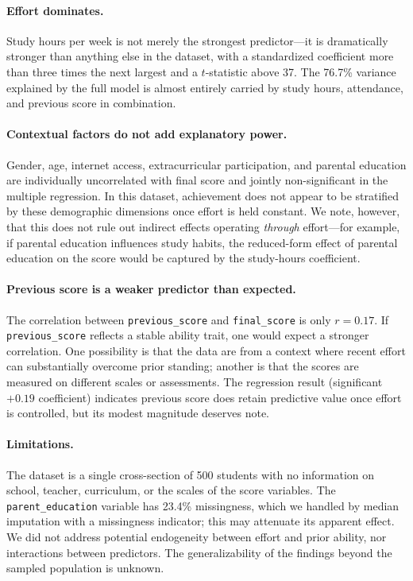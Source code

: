 \documentclass[11pt]{article}
\begin{document}
\paragraph{Effort dominates.} Study hours per week is not merely the strongest predictor---it is dramatically stronger than anything else in the dataset, with a standardized coefficient more than three times the next largest and a $t$-statistic above 37. The 76.7\% variance explained by the full model is almost entirely carried by study hours, attendance, and previous score in combination.

\paragraph{Contextual factors do not add explanatory power.} Gender, age, internet access, extracurricular participation, and parental education are individually uncorrelated with final score and jointly non-significant in the multiple regression. In this dataset, achievement does not appear to be stratified by these demographic dimensions once effort is held constant. We note, however, that this does not rule out indirect effects operating \emph{through} effort---for example, if parental education influences study habits, the reduced-form effect of parental education on the score would be captured by the study-hours coefficient.

\paragraph{Previous score is a weaker predictor than expected.} The correlation between \texttt{previous\_score} and \texttt{final\_score} is only $r=0.17$. If \texttt{previous\_score} reflects a stable ability trait, one would expect a stronger correlation. One possibility is that the data are from a context where recent effort can substantially overcome prior standing; another is that the scores are measured on different scales or assessments. The regression result (significant $+0.19$ coefficient) indicates previous score does retain predictive value once effort is controlled, but its modest magnitude deserves note.

\paragraph{Limitations.} The dataset is a single cross-section of 500 students with no information on school, teacher, curriculum, or the scales of the score variables. The \texttt{parent\_education} variable has 23.4\% missingness, which we handled by median imputation with a missingness indicator; this may attenuate its apparent effect. We did not address potential endogeneity between effort and prior ability, nor interactions between predictors. The generalizability of the findings beyond the sampled population is unknown.
\end{document}
